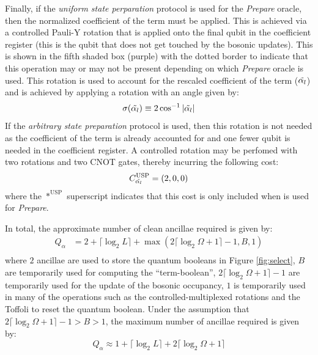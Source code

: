 Finally, if the \textit{uniform state perparation} protocol is used for the \textit{Prepare} oracle, then the normalized coefficient of the term must be applied.
This is achieved via a controlled Pauli-Y rotation that is applied onto the final qubit in the coefficient register (this is the qubit that does not get touched by the bosonic updates).
This is shown in the fifth shaded box (purple) with the dotted border to indicate that this operation may or may not be present depending on which \textit{Prepare} oracle is used.
This rotation is used to account for the rescaled coefficient of the term ($\Tilde{\alpha_l}$) and is achieved by applying a rotation with an angle given by:
\begin{equation}
    \sigma(\Tilde{\alpha_l}) \equiv 2 \cos^{-1}{|\Tilde{\alpha_l}|}
\end{equation}
If the \textit{arbitrary state preparation} protocol is used, then this rotation is not needed as the coefficient of the term is already accounted for and one fewer qubit is needed in the coefficient register.
A controlled rotation may be perfomed with two rotations and two CNOT gates, thereby incurring the following cost:
\begin{equation}
    C_{\Tilde{\alpha_l}}^\text{USP} = (2, 0, 0)
\end{equation}
where the $*^\text{USP}$ superscript indicates that this cost is only included when  is used for \textit{Prepare}.

In total, the approximate number of clean ancillae required is given by:
\begin{equation}
    \begin{split}
        Q_\alpha &= 2 + \lceil \log_2{L} \rceil + \max{(2 \lceil \log_2{\Omega + 1} \rceil - 1, B, 1)} \\ 
    \end{split}
\end{equation}
where $2$ ancillae are used to store the quantum booleans in Figure \ref{fig:select}, $B$ are temporarily used for computing the ``term-boolean'', $2 \lceil \log_2{\Omega + 1} \rceil - 1$ are temporarily used for the update of the bosonic occupancy, $1$ is temporarily used in many of the operations such as the controlled-multiplexed rotations and the Toffoli to reset the quantum boolean.
Under the assumption that $2 \lceil \log_2{\Omega + 1} \rceil - 1 > B > 1$, the maximum number of ancillae required is given by:
\begin{equation}
    Q_\alpha \approx 1 + \lceil \log_2{L} \rceil + 2 \lceil \log_2{\Omega + 1} \rceil
\end{equation}

